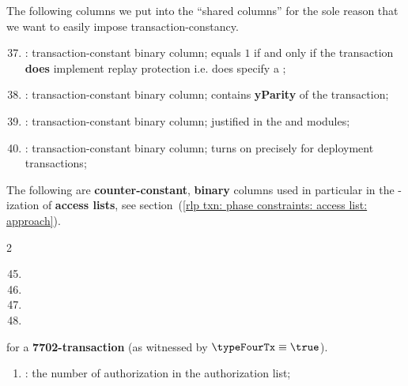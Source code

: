 The following columns we put into the ``shared columns'' for the sole reason that we want to easily impose transaction-constancy.
\begin{enumerate}
	\setcounter{enumi}{36}
    \item 
	\rlpTxnCommonColumnReplayProtection{}:
	transaction-constant binary column;
	equals $1$ if and only if the transaction \textbf{does} implement replay protection i.e.
	does specify a \chainId{};
    \item
	\rlpTxnCommonColumnYparity{}:
	transaction-constant binary column;
	contains \textbf{yParity} of the transaction;
    \item
	\rlpTxnSharedColumnRequiresEvmExecution{}:
	transaction-constant binary column;
	justified in the \userTxnDataMod{} and \hubMod{} modules;
    \item
	\markAsJustifiedHere{}
	\rlpTxnSharedColumnIsDep{}:
	transaction-constant binary column;
	turns on precisely for deployment transactions;
\end{enumerate}
The following are \textbf{counter-constant}, \textbf{binary} columns used in particular in the \rlp{}-ization of \textbf{access lists},
see section~(\ref{rlp txn: phase constraints: access list: approach}).
\begin{multicols}{2}
    \begin{enumerate}[resume]
	    \setcounter{enumi}{44}
	\item \rlpTxnSharedColumnIsPrefixOfAccessListItem
	\item \rlpTxnSharedColumnIsPrefixOfStorageKeyList
	\item \rlpTxnSharedColumnIsAccessListAddress
	\item \rlpTxnSharedColumnIsAccessListStorageKey
    \end{enumerate}
\end{multicols}
for a \textbf{7702-transaction} (as witnessed by $\typeFourTx \equiv \true$).
\begin{enumerate}[resume]
    \item
	\markAsJustifiedHere{}
	\rlpTxnCommonColumnNumberOfAuthorizations{}:
	the number of authorization in the authorization list;
\end{enumerate}
